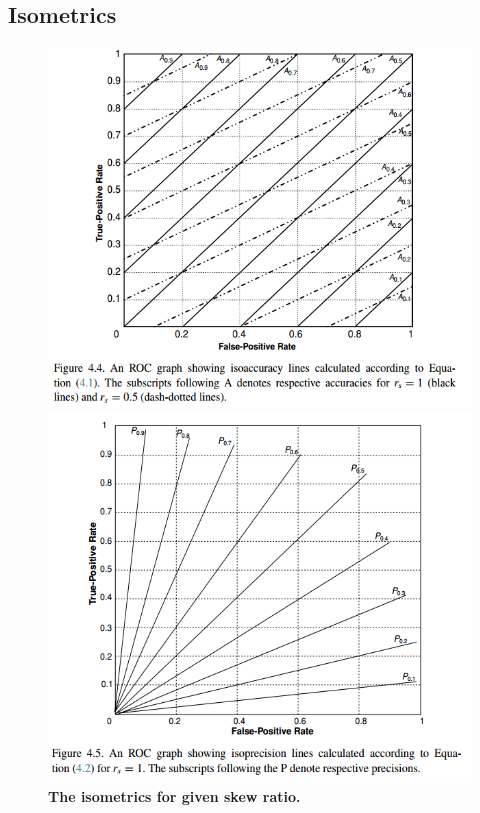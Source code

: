 \documentclass[11pt]{article}
\begin{document}
\subsection{Isometrics}
\begin{figure}
\begin{minipage}[t]{1\linewidth}
  \centering
  \centerline{\includegraphics[scale = 0.5]{isoaccuracy.png}}
\end{minipage}
\begin{minipage}[t]{1\linewidth}
  \centering
  \centerline{\includegraphics[scale = 0.5]{isoprecision.png}}
\end{minipage}
\caption{\footnotesize{\textbf{The isometrics for given skew ratio.}}}
\label{fig: isometrics}
\end{figure}
\end{document}
